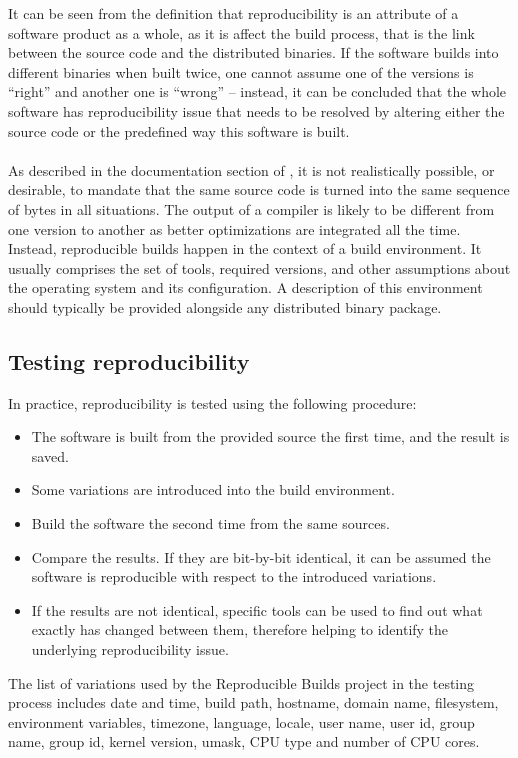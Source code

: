 {It can be seen from the definition that reproducibility is an attribute of a software product as a whole, as it is affect the build process, that is the link between the source code and the distributed binaries. If the software builds into different binaries when built twice, one cannot assume one of the versions is ``right'' and another one is ``wrong'' -- instead, it can be concluded that the whole software has reproducibility issue that needs to be resolved by altering either the source code or the predefined way this software is built.\\\\

As described in the documentation section of \autocite{rb}, it is not realistically possible, or desirable, to mandate that the same source code is turned into the same sequence of bytes in all situations. The output of a compiler is likely to be different from one version to another as better optimizations are integrated all the time. 
Instead, reproducible builds happen in the context of a build environment. It usually comprises the set of tools, required versions, and other assumptions about the operating system and its configuration. A description of this environment should typically be provided alongside any distributed binary package.
}
\subsection[Testing reproducibility]{Testing reproducibility}
In practice, reproducibility is tested using the following procedure:
\begin{itemize}
    \item The software is built from the provided source the first time, and the result is saved.
    \item Some variations are introduced into the build environment.
    \item Build the software the second time from the same sources.
    \item Compare the results. If they are bit-by-bit identical, it can be assumed the software is reproducible with respect to the introduced variations.
    \item If the results are not identical, specific tools can be used to find out what exactly has changed between them, therefore helping to identify the underlying reproducibility issue.
\end{itemize}

The list of variations used by the Reproducible Builds project in the testing process includes 
    date and time,
    build path,
    hostname,
    domain name,
    filesystem,
    environment variables,
    timezone,
    language,
    locale,
    user name,
    user id,
    group name,
    group id,
    kernel version,
    umask,
    CPU type and number of CPU cores.



